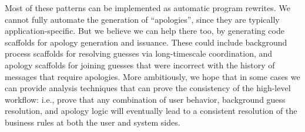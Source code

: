 Most of these patterns can be implemented as automatic program rewrites.  We cannot fully automate the generation of ``apologies'', since they are typically application-specific.  But we believe we can help there too, by generating code scaffolds for apology generation and issuance.  These could include background process scaffolds for resolving guesses via long-timescale coordination, and apology scaffolds for joining guesses that were incorrect with the history of messages that require apologies.  More ambitiously, we hope that in some cases we can provide analysis techniques that can prove the consistency of the high-level workflow: i.e., prove that any combination of user behavior, background guess resolution, and apology logic will eventually lead to a consistent resolution of the business rules at both the user and system sides.